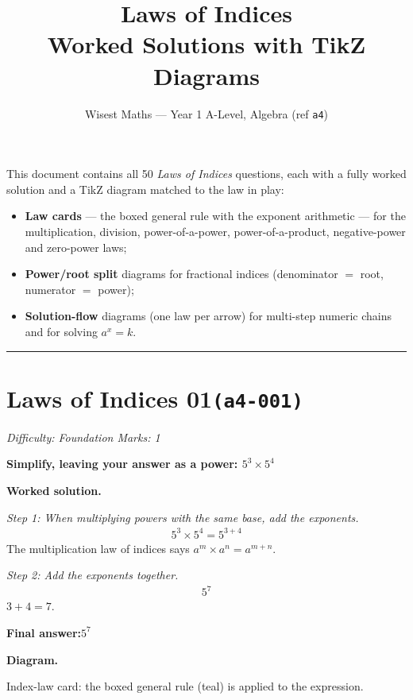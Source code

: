 \documentclass[11pt]{article}
\title{\textbf{Laws of Indices}\\[0.3em]\large Worked Solutions with TikZ Diagrams}
\author{Wisest Maths --- Year 1 A-Level, Algebra (ref \texttt{a4})}
\date{}
\newcommand{\question}[1]{\par\medskip\noindent\textbf{#1}\par}
\begin{document}
\maketitle
\noindent This document contains all 50 \emph{Laws of Indices} questions, each with a fully
worked solution and a TikZ diagram matched to the law in play:
\begin{itemize}\setlength{\itemsep}{1pt}
  \item \textbf{Law cards} --- the boxed general rule with the exponent arithmetic --- for the multiplication, division, power-of-a-power, power-of-a-product, negative-power and zero-power laws;
  \item \textbf{Power/root split} diagrams for fractional indices (denominator $=$ root, numerator $=$ power);
  \item \textbf{Solution-flow} diagrams (one law per arrow) for multi-step numeric chains and for solving $a^{x}=k$.
\end{itemize}
\tableofcontents
\bigskip
\hrule

\section*{Laws of Indices 01\quad\small\texttt{(a4-001)}}
\textit{Difficulty: Foundation \quad\textbar\quad Marks: 1}

\question{Simplify, leaving your answer as a power: \( 5^3 \times 5^4 \)}

\textbf{Worked solution.}

\textit{Step 1: When multiplying powers with the same base, add the exponents.}
\[\begin{gathered}
5^3 \times 5^4 = 5^{3+4}
\end{gathered}\]
The multiplication law of indices says \( a^m \times a^n = a^{m+n} \).

\textit{Step 2: Add the exponents together.}
\[\begin{gathered}
5^{7}
\end{gathered}\]
\( 3 + 4 = 7 \).

\begin{answerbox}
\textbf{Final answer:}\quad \(\displaystyle 5^{7}\)
\end{answerbox}
\textbf{Diagram.}

\begin{center}
\end{center}
\small Index-law card: the boxed general rule (teal) is applied to the expression.\normalsize
\end{document}
